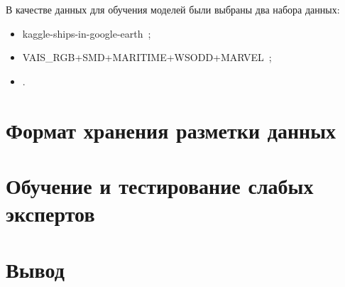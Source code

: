 В качестве данных для обучения моделей были выбраны два набора данных:
\begin{itemize}[label=---]
    \item kaggle-ships-in-google-earth~\cite{kaggle-ships-in-google-earth-dfqwt_dataset};
    \item VAIS\_RGB+SMD+MARITIME+WSODD+MARVEL~\cite{vais_rgb-smd-maritime-wsodd-marvel_dataset};
    \item \cite{ship-ubxk4_dataset}.
\end{itemize}

\section{Формат хранения разметки данных}

\section{Обучение и тестирование слабых экспертов}

\section{Вывод}